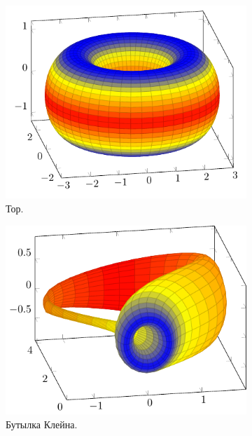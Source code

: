 \begin{figure}[htbp]
    \centering
    \begin{subfigure}[b]{0.48\textwidth}
        \includegraphics[scale=0.8]{images/c9.2.pdf}
        \caption{Тор.}
        \label{fig:thorus}
    \end{subfigure}
    \hfill
    \begin{subfigure}[b]{0.48\textwidth}
        \includegraphics[scale=0.8]{images/c9.1.pdf}
        \caption{Бутылка Клейна.}
        \label{fig:kleyn}
    \end{subfigure}
    \hfill
    \begin{subfigure}[b]{0.48\textwidth}

\end{subfigure}
\end{figure}
